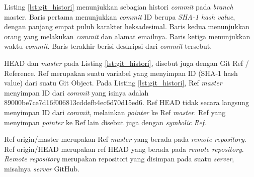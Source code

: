 Listing \ref{lst:git_histori} menunjukkan sebagian histori \textit{commit} pada \textit{branch} master. Baris pertama menunjukkan \textit{commit} ID berupa \textit{SHA-1 hash value}, dengan panjang empat puluh karakter heksadesimal. Baris kedua menunjukkan orang yang melakukan \textit{commit} dan alamat emailnya. Baris ketiga menunjukkan waktu \textit{commit}. Baris terakhir berisi deskripsi dari \textit{commit} tersebut.

HEAD dan \textit{master} pada Listing \ref{lst:git_histori}, disebut juga dengan Git Ref / Reference. Ref merupakan suatu variabel yang menyimpan ID (SHA-1 hash value) dari suatu Git Object. Pada Listing \ref{lst:git_histori}, Ref \textit{master} menyimpan ID dari \textit{commit} yang isinya adalah 89000be7ce7d16f006813cddefb4ec6d70d15ed6. Ref HEAD tidak secara langsung menyimpan ID dari \textit{commit}, melainkan \textit{pointer} ke Ref \textit{master}. Ref yang menyimpan \textit{pointer} ke Ref lain disebut juga dengan \textit{symbolic Ref}. 

Ref origin/master merupakan Ref \textit{master} yang berada pada \textit{remote repository}. 
Ref origin/HEAD merupakan ref HEAD yang berada pada \textit{remote repository}. \textit{Remote repository} merupakan repositori yang disimpan pada suatu \textit{server}, misalnya \textit{server} GitHub. 

